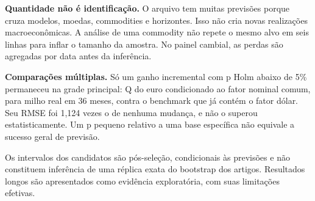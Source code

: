 \documentclass[11pt,a4paper]{article}
\begin{document}
\textbf{Quantidade não é identificação.} O arquivo tem muitas previsões porque cruza modelos, moedas, commodities e horizontes. Isso não cria novas realizações macroeconômicas. A análise de uma commodity não repete o mesmo alvo em seis linhas para inflar o tamanho da amostra. No painel cambial, as perdas são agregadas por data antes da inferência.

\textbf{Comparações múltiplas.} Só um ganho incremental com p Holm abaixo de 5\% permaneceu na grade principal: Q do euro condicionado ao fator nominal comum, para milho real em 36 meses, contra o benchmark que já contém o fator dólar. Seu RMSE foi 1,124 vezes o de nenhuma mudança, e não o superou estatisticamente. Um p pequeno relativo a uma base específica não equivale a sucesso geral de previsão.

Os intervalos dos candidatos são pós-seleção, condicionais às previsões e não constituem inferência de uma réplica exata do bootstrap dos artigos. Resultados longos são apresentados como evidência exploratória, com suas limitações efetivas.

\clearpage
\end{document}
